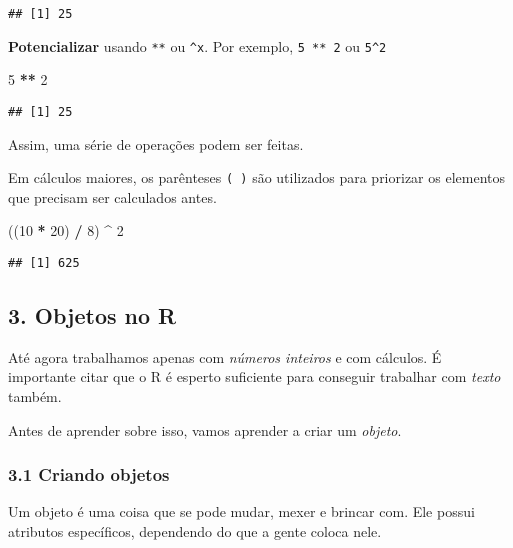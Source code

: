 \documentclass[
]{article}
\newenvironment{Shaded}{\begin{snugshade}}{\end{snugshade}}
\newcommand{\DecValTok}[1]{\textcolor[rgb]{0.00,0.00,0.81}{#1}}
\newcommand{\NormalTok}[1]{#1}
\newcommand{\OperatorTok}[1]{\textcolor[rgb]{0.81,0.36,0.00}{\textbf{#1}}}
\newcommand{\StringTok}[1]{\textcolor[rgb]{0.31,0.60,0.02}{#1}}
\begin{document}
\begin{verbatim}
## [1] 25
\end{verbatim}

\textbf{Potencializar} usando \texttt{**} ou \texttt{\^{}x}. Por
exemplo, \texttt{5\ **\ 2} ou \texttt{5\^{}2}

\begin{Shaded}
\begin{Highlighting}[]
\DecValTok{5} \OperatorTok{**}\StringTok{ }\DecValTok{2}
\end{Highlighting}
\end{Shaded}

\begin{verbatim}
## [1] 25
\end{verbatim}

Assim, uma série de operações podem ser feitas.

Em cálculos maiores, os parênteses \texttt{(\ )} são utilizados para
priorizar os elementos que precisam ser calculados antes.

\begin{Shaded}
\begin{Highlighting}[]
\NormalTok{((}\DecValTok{10} \OperatorTok{*}\StringTok{ }\DecValTok{20}\NormalTok{) }\OperatorTok{/}\StringTok{ }\DecValTok{8}\NormalTok{) }\OperatorTok{^}\StringTok{ }\DecValTok{2}
\end{Highlighting}
\end{Shaded}

\begin{verbatim}
## [1] 625
\end{verbatim}

\hypertarget{objetos-no-r}{%
\subsection{3. Objetos no R}\label{objetos-no-r}}

Até agora trabalhamos apenas com \emph{números inteiros} e com cálculos.
É importante citar que o R é esperto suficiente para conseguir trabalhar
com \emph{texto} também.

Antes de aprender sobre isso, vamos aprender a criar um \emph{objeto}.

\hypertarget{criando-objetos}{%
\subsubsection{3.1 Criando objetos}\label{criando-objetos}}

Um objeto é uma coisa que se pode mudar, mexer e brincar com. Ele possui
atributos específicos, dependendo do que a gente coloca nele.
\end{document}
